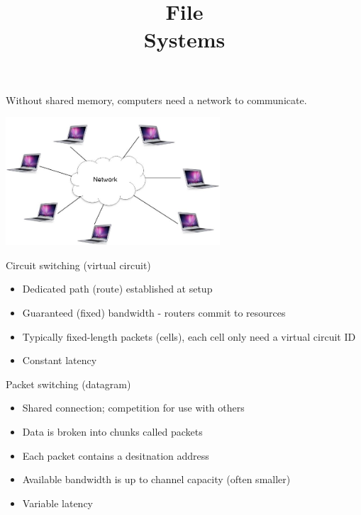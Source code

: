 

\title{File\\Systems}
 


\begin{frame}
    \titlepage
\end{frame}

\begin{slide}
	
	
	Without shared memory, computers need a network to communicate.
	\bigskip
	
	\includegraphics[width=80mm]{inter-computer-comm.png}
	
\end{slide}

\begin{slide}

	
	Circuit switching (virtual circuit)
	\begin{itemize}
		\item Dedicated path (route) established at setup
		\item Guaranteed (fixed) bandwidth - routers commit to resources
		\item Typically fixed-length packets (cells), each cell only need a virtual circuit ID
		\item Constant latency
	\end{itemize}
	\bigskip
	
	Packet switching (datagram)
	\begin{itemize}
		\item Shared connection; competition for use with others
		\item Data is broken into chunks called packets
		\item Each packet contains a desitnation address
		\item Available bandwidth is up to channel capacity (often smaller)
		\item Variable latency
	\end{itemize}

\end{slide}

